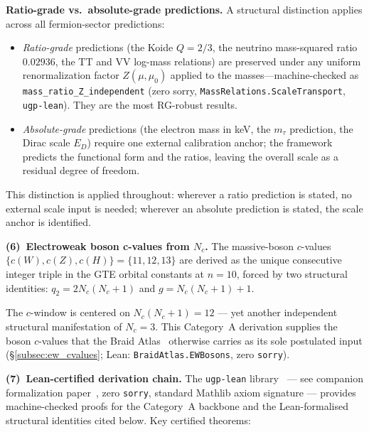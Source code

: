 \documentclass[11pt]{article}
\theoremstyle{remark}
\begin{document}
\medskip\noindent\textbf{Ratio-grade vs.\ absolute-grade predictions.}
A structural distinction applies across all fermion-sector predictions:
\begin{itemize}[leftmargin=1.5em,itemsep=0.15em,topsep=0.2em]
  \item \emph{Ratio-grade} predictions (the Koide $Q=2/3$, the neutrino mass-squared ratio $0.02936$, the TT and VV log-mass relations) are preserved under any uniform renormalization factor $Z(\mu,\mu_0)$ applied to the masses---machine-checked as \texttt{mass\_ratio\_Z\_independent} (zero sorry, \texttt{MassRelations.ScaleTransport}, \texttt{ugp-lean}).  They are the most RG-robust results.
  \item \emph{Absolute-grade} predictions (the electron mass in keV, the $m_\tau$ prediction, the Dirac scale $E_D$) require one external calibration anchor; the framework predicts the functional form and the ratios, leaving the overall scale as a residual degree of freedom.
\end{itemize}
This distinction is applied throughout: wherever a ratio prediction is stated, no external scale input is needed; wherever an absolute prediction is stated, the scale anchor is identified.


\medskip
\noindent\textbf{(6)~Electroweak boson c-values from $N_c$.}
The massive-boson $c$-values $\{c(W), c(Z), c(H)\} = \{11, 12, 13\}$ are derived as the unique consecutive integer triple in the GTE orbital constants at $n{=}10$, forced by two structural identities: $q_2 = 2N_c(N_c{+}1)$ and $g = N_c(N_c{+}1){+}1$.

The $c$-window is centered on $N_c(N_c{+}1) = 12$ --- yet another independent structural manifestation of $N_c = 3$.  This Category~A derivation supplies the boson $c$-values that the Braid Atlas~\cite{SpivackBraidAtlas} otherwise carries as its sole postulated input (\S\ref{subsec:ew_cvalues}; Lean: \texttt{BraidAtlas.EWBosons}, zero \texttt{sorry}).


\medskip
\noindent\textbf{(7)~Lean-certified derivation chain.}
The \texttt{ugp-lean} library~\cite{SpivackUGPFormalization,ugp-lean} --- see companion formalization paper~\cite{SpivackUGPFormalization}, zero \texttt{sorry}, standard Mathlib axiom signature --- provides machine-checked proofs for the Category~A backbone and the Lean-formalised structural identities cited below.  Key certified theorems:
\end{document}
